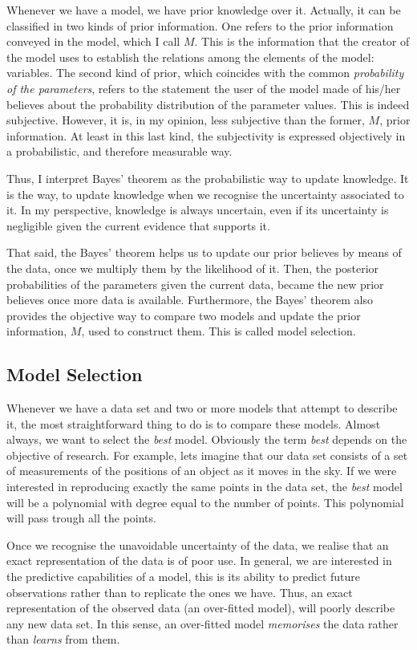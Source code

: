 Whenever we have a model, we have prior knowledge over it. Actually, it can be classified in two kinds of prior information. One refers to the prior information conveyed in the model, which I call $M$. This is the information that the creator of the model uses to establish the relations among the elements of the model: variables. The second kind of prior, which coincides with the common \emph{probability of the parameters}, refers to the statement the user of the model made of his/her believes about the probability distribution of the parameter values. This is indeed subjective. However, it is, in my opinion, less subjective than the former, $M$, prior information. At least in this last kind, the subjectivity is expressed objectively in a probabilistic, and therefore measurable way.

Thus, I interpret Bayes' theorem as the probabilistic way to update knowledge. It is the way, to update knowledge when we recognise the uncertainty associated to it. In my perspective, knowledge is always uncertain, even if its uncertainty is negligible given the current evidence that supports it. 

That said, the Bayes' theorem helps us to update our prior believes by means of the data, once we multiply them by the likelihood of it. Then, the posterior probabilities of the parameters given the current data, became the new prior believes once more data is available. Furthermore, the Bayes' theorem also provides the objective way to compare two models and update the prior information, $M$, used to construct them. This is called model selection.

\subsection{Model Selection}

Whenever we have a data set and two or more models that attempt to describe it, the most straightforward thing to do is to compare these models. Almost always, we want to select the \emph{best} model. Obviously the term \emph{best} depends on the objective of research. For example, lets imagine that our data set consists of a set of measurements of the positions of an object as it moves in the sky. If we were interested in reproducing exactly the same points in the data set, the \emph{best} model will be a polynomial with degree equal to the number of points. This polynomial will pass trough all the points. 

Once we recognise the unavoidable uncertainty of the data, we realise that an exact representation of the data is of poor use. 
In general, we are interested in the predictive capabilities of a model, this is its ability to predict future observations rather than to replicate the ones we have. Thus, an exact representation of the observed data (an over-fitted model), will poorly describe any new data set. In this sense, an over-fitted model \emph{memorises} the data rather than \emph{learns} from them.

